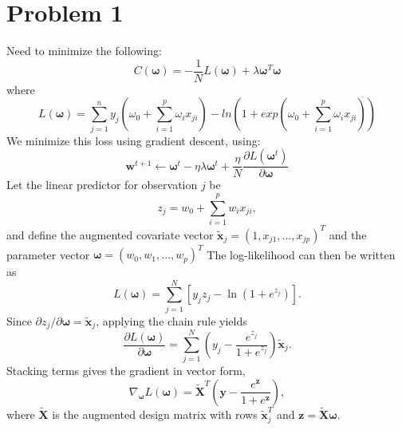 \documentclass[12pt]{article}
\begin{document}
\section*{Problem 1}
Need to minimize the following:
    \[
    C(\boldsymbol{\omega}) = -\frac{1}{N}L(\boldsymbol{\omega}) + \lambda\boldsymbol{\omega}^T\boldsymbol{\omega}
    \]
    where 
    \[
    L(\boldsymbol{\omega}) = \sum_{j=1}^{n}y_j(\omega_0 + \sum_{i=1}^{p}\omega_ix_{ji}) - 
    ln(1+ exp(\omega_0 + \sum_{i=1}^{p}\omega_ix_{ji}))
    \]
    We minimize this loss using gradient descent, using:
    \[
    \boldsymbol{w}^{t+1}\leftarrow \boldsymbol{\omega}^{t} - \eta\lambda\boldsymbol{\omega}^{t} + 
    \frac{\eta}{N}\frac{\partial L(\boldsymbol{\omega}^{t})}{\partial \boldsymbol{\omega}}
    \]
    Let the linear predictor for observation \(j\) be
    \[
    z_j = w_0 + \sum_{i=1}^p w_i x_{ji},
    \]
    and define the augmented covariate vector \(\tilde{\boldsymbol{x}}_j = (1, x_{j1}, \ldots, x_{jp})^T\)
    and the parameter vector \(\boldsymbol{\omega} = (w_0, w_1, \ldots, w_p)^T\)
    The log-likelihood can then be written as
    \[
    L(\boldsymbol{\omega}) = \sum_{j=1}^N
    \left[ y_j z_j - \ln\!\left(1 + e^{z_j}\right) \right].
    \]
    Since \(\partial z_j / \partial \boldsymbol{\omega} = \tilde{\boldsymbol{x}}_j\),
    applying the chain rule yields
    \[
    \frac{\partial L(\boldsymbol{\omega})}{\partial \boldsymbol{\omega}}
    = \sum_{j=1}^N
    \left(
    y_j - \frac{e^{z_j}}{1 + e^{z_j}}
    \right)\tilde{\boldsymbol{x}}_j.
    \]
    Stacking terms gives the gradient in vector form,
    \[
    \nabla_{\boldsymbol{\omega}} L(\boldsymbol{\omega})
    = \tilde{\boldsymbol{X}}^{T}
    \left(
    \boldsymbol{y} - \frac{e^{\boldsymbol{z}}}{1 + e^{\boldsymbol{z}}}
    \right),
    \]
    where \(\tilde{\boldsymbol{X}}\) is the augmented design matrix with rows
    \(\tilde{\boldsymbol{x}}_j^{T}\) and
    \(\boldsymbol{z} = \tilde{\boldsymbol{X}}\boldsymbol{\omega}\).
\end{document}

